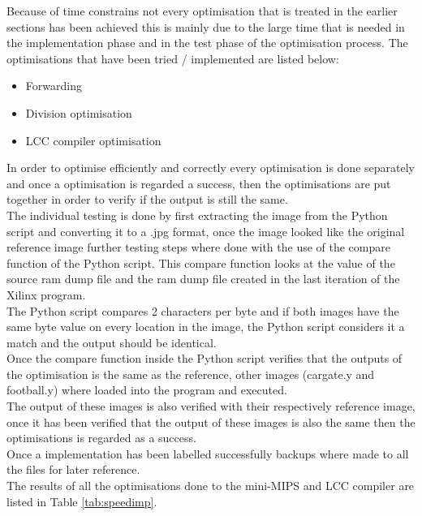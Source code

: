 \documentclass[10pt]{article}
\begin{document}
Because of time constrains not every optimisation that is treated in the earlier sections has been achieved this is mainly due to the large time that is needed in the implementation phase and in the test phase of the optimisation process.
The optimisations that have been tried / implemented are listed below:
\begin{itemize}
    \item Forwarding
    \item Division optimisation
    \item LCC compiler optimisation
 \end{itemize}
In order to optimise efficiently and correctly every optimisation is done separately and once a optimisation is regarded a success, then the optimisations are put together in order to verify if the output is still the same.\\
The individual testing is done by first extracting the image from the Python script and converting it to a .jpg format, once the image looked like the original reference image further testing steps where done with the use of the compare function of the Python script. This compare function looks at the value of the source ram dump file and the ram dump file created in the last iteration of the Xilinx program.\\
The Python script compares 2 characters per byte and if both images have the same byte value on every location in the image, the Python script considers it a match and the output should be identical.\\
Once the compare function inside the Python script verifies that the outputs of the optimisation is the same as the reference, other images (cargate.y and football.y) where loaded into the program and executed.\\ 
The output of these images is also verified with their respectively reference image, once it has been verified that the output of these images is also the same then the optimisations is regarded as a success.\\
Once a implementation has been labelled successfully backups where made to all the files for later reference.\\
The results of all the optimisations done to the mini-MIPS and LCC compiler are listed in Table \ref{tab:speedimp}.
\end{document}
